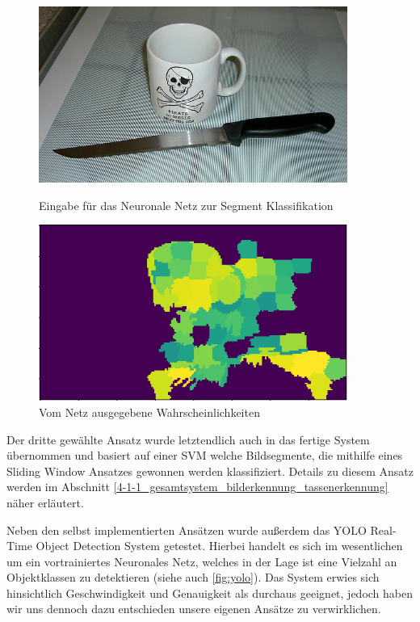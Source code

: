 \begin{figure}
    \centering
    \begin{minipage}{0.45\textwidth}
        \centering
        \includegraphics[width=0.9\textwidth]{images/cup_patches.jpg} %
        \caption{Eingabe für das Neuronale Netz zur Segment Klassifikation \label{fig:patches_prediction}}
    \end{minipage}\hfill
    \begin{minipage}{0.48\textwidth}
        \centering
        \includegraphics[width=0.9\textwidth]{images/cup_patches_prediction.png} %
        \caption{Vom Netz ausgegebene Wahrscheinlichkeiten \label{fig:patches_prediction_result}}
    \end{minipage}
\end{figure}

Der dritte gewählte Ansatz wurde letztendlich auch in das fertige System übernommen und basiert auf einer SVM welche Bildsegmente, die mithilfe eines Sliding Window Ansatzes gewonnen werden klassifiziert. Details zu diesem Ansatz werden im Abschnitt \ref{4-1-1_gesamtsystem_bilderkennung_tassenerkennung} näher erläutert.

Neben den selbst implementierten Ansätzen wurde außerdem das YOLO Real-Time Object Detection System getestet. Hierbei handelt es sich im wesentlichen um ein vortrainiertes Neuronales Netz, welches in der Lage ist eine Vielzahl an Objektklassen zu detektieren (siehe auch \ref{fig:yolo}). Das System erwies sich hinsichtlich Geschwindigkeit und Genauigkeit als durchaus geeignet, jedoch haben wir uns dennoch dazu entschieden unsere eigenen Ansätze zu verwirklichen.

